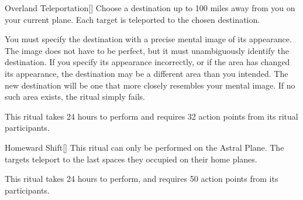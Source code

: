 \lowercase{\hypertarget{spell:Overland Teleportation}{}}\label{spell:Overland Teleportation}
\begin{apability}[\nth{4}]{\hypertarget{spell:Overland Teleportation}{Overland Teleportation}}[]
Choose a destination up to 100 miles away from you on your current plane.
Each target is teleported to the chosen destination.

You must specify the destination with a precise mental image of its appearance.
The image does not have to be perfect, but it must unambiguously identify the destination.
If you specify its appearance incorrectly, or if the area has changed its appearance, the destination may be a different area than you intended.
The new destination will be one that more closely resembles your mental image.
If no such area exists, the ritual simply fails.

This ritual takes 24 hours to perform and requires 32 action points from its ritual participants.
\end{apability}
\vspace{0.25em}



\lowercase{\hypertarget{spell:Homeward Shift}{}}\label{spell:Homeward Shift}
\begin{apability}[\nth{5}]{\hypertarget{spell:Homeward Shift}{Homeward Shift}}[]
This ritual can only be performed on the Astral Plane.
The targets teleport to the last spaces they occupied on their home planes.

This ritual takes 24 hours to perform, and requires 50 action points from its participants.
\end{apability}
\vspace{0.25em}



